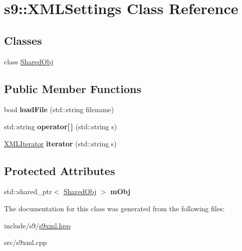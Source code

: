 \hypertarget{classs9_1_1XMLSettings}{\section{s9\-:\-:\-X\-M\-L\-Settings \-Class \-Reference}
\label{classs9_1_1XMLSettings}
}
\subsection*{\-Classes}
\begin{DoxyCompactItemize}
\item 
class \hyperlink{classs9_1_1XMLSettings_1_1SharedObj}{\-Shared\-Obj}
\end{DoxyCompactItemize}
\subsection*{\-Public \-Member \-Functions}
\begin{DoxyCompactItemize}
\item 
\hypertarget{classs9_1_1XMLSettings_a34f91250fbd58585d953909b97faa4bd}{bool {\bfseries load\-File} (std\-::string filename)}\label{classs9_1_1XMLSettings_a34f91250fbd58585d953909b97faa4bd}

\item 
\hypertarget{classs9_1_1XMLSettings_aaad33d1df91879d99afee855faa0a0dc}{std\-::string {\bfseries operator\mbox{[}$\,$\mbox{]}} (std\-::string s)}\label{classs9_1_1XMLSettings_aaad33d1df91879d99afee855faa0a0dc}

\item 
\hypertarget{classs9_1_1XMLSettings_a9b85b894b47df6268b77275332c2d9d4}{\hyperlink{classs9_1_1XMLIterator}{\-X\-M\-L\-Iterator} {\bfseries iterator} (std\-::string s)}\label{classs9_1_1XMLSettings_a9b85b894b47df6268b77275332c2d9d4}

\end{DoxyCompactItemize}
\subsection*{\-Protected \-Attributes}
\begin{DoxyCompactItemize}
\item 
\hypertarget{classs9_1_1XMLSettings_a791bd9646cbce5d125cb5f38605630ba}{std\-::shared\-\_\-ptr$<$ \hyperlink{classs9_1_1XMLSettings_1_1SharedObj}{\-Shared\-Obj} $>$ {\bfseries m\-Obj}}\label{classs9_1_1XMLSettings_a791bd9646cbce5d125cb5f38605630ba}

\end{DoxyCompactItemize}


\-The documentation for this class was generated from the following files\-:\begin{DoxyCompactItemize}
\item 
include/s9/\hyperlink{s9xml_8hpp}{s9xml.\-hpp}\item 
src/s9xml.\-cpp\end{DoxyCompactItemize}
